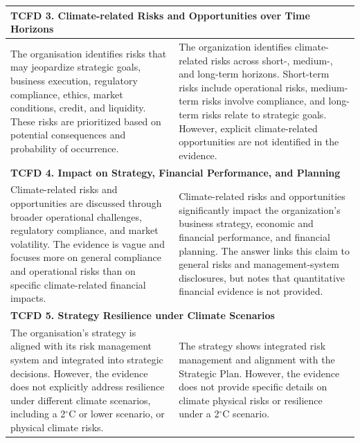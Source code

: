 \documentclass[11pt]{article}
\begin{document}
\begin{table}[t]
{\begin{tabular}{p{}|p{}}
\multicolumn{2}{l}{\textbf{TCFD 3. Climate-related Risks and Opportunities over Time Horizons}} \\
\hline
The organisation identifies risks that may jeopardize strategic goals, business execution, regulatory compliance, ethics, market conditions, credit, and liquidity. 
These risks are prioritized based on potential consequences and probability of occurrence.
&
The organization identifies climate-related risks across short-, medium-, and long-term horizons. 
Short-term risks include operational risks, medium-term risks involve compliance, and long-term risks relate to strategic goals. 
\textcolor{casered}{However, explicit climate-related opportunities are not identified in the evidence.}
\\
\hline

\multicolumn{2}{l}{\textbf{TCFD 4. Impact on Strategy, Financial Performance, and Planning}} \\
\hline
Climate-related risks and opportunities are discussed through broader operational challenges, regulatory compliance, and market volatility. 
\textcolor{caseblue}{The evidence is vague and focuses more on general compliance and operational risks than on specific climate-related financial impacts.}
&
\textcolor{casered}{Climate-related risks and opportunities significantly impact} the organization's business strategy, economic and financial performance, and financial planning. 
The answer links this claim to general risks and management-system disclosures, but notes that quantitative financial evidence is not provided.
\\
\hline

\multicolumn{2}{l}{\textbf{TCFD 5. Strategy Resilience under Climate Scenarios}} \\
\hline
The organisation's strategy is aligned with its risk management system and integrated into strategic decisions. 
\textcolor{caseblue}{However, the evidence does not explicitly address resilience under different climate scenarios, including a 2$^\circ$C or lower scenario, or physical climate risks.}
&
The strategy shows integrated risk management and alignment with the Strategic Plan. 
However, the evidence does not provide specific details on climate physical risks or resilience under a 2$^\circ$C scenario.
\\
\hline


\end{tabular}}
\end{table}
\end{document}
